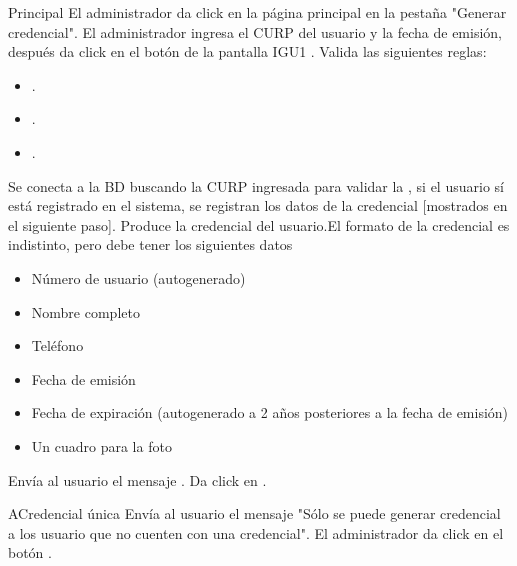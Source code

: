 	\begin{UCtrayectoria}{Principal}
	\UCpaso[\UCactor] El administrador da click en la página principal en la pestaña "Generar credencial".
	\UCpaso[\UCactor] El administrador ingresa el CURP del usuario y la fecha de emisión, después da click en el botón  de la pantalla IGU1 .	
	\UCpaso[\UCsist] Valida las siguientes reglas:
	\begin{itemize}
		\item {} .
		\item {} .
		\item {} .	
	\end{itemize} 

		\UCpaso[\UCsist] Se conecta a la BD buscando la CURP ingresada para validar la  , si el usuario sí está registrado en el sistema, se registran los datos de la credencial [mostrados en el siguiente paso].  
		\UCpaso[\UCsist] Produce la credencial del usuario.El formato de la credencial es indistinto, pero debe tener los siguientes datos
		\begin{itemize}
			\item Número de usuario (autogenerado)
			\item Nombre completo
			\item Teléfono
			\item Fecha de emisión
			\item Fecha de expiración (autogenerado a 2 años posteriores a la fecha de emisión)
			\item Un cuadro para la foto
		\end{itemize}		 
		
		\UCpaso[\UCsist] Envía al usuario el mensaje .
		\UCpaso[\UCactor]Da click en .

		\end{UCtrayectoria}		
		\begin{UCtrayectoriaA}{A}{Credencial única}
			\UCpaso[\UCsist] Envía al usuario el mensaje "Sólo se puede generar credencial a los usuario que no cuenten con una credencial".
			\UCpaso[\UCsist] El administrador da click en el botón .
		\end{UCtrayectoriaA}


